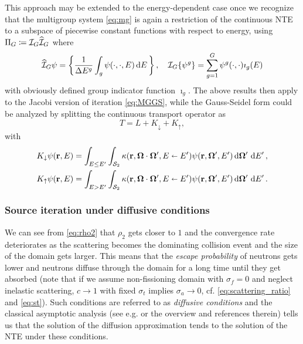 \begin{remark}\label{rem:MG}
	This approach may be extended to the energy-dependent case once we recognize that the multigroup system
	\eqref{eq:mg} is again a restriction of the continuous NTE to a subspace of piecewise constant functions with respect
	to energy, using $\Projop[G] \coloneqq \PiG\PihG$ where
	$$
		\PihG\psi = \left\{\frac{1}{\Delta E^{g}}\int_{g}\psi(\cdot,\cdot,E)\,\d{E}\right\},\quad
		\PiG\{\psi^g\} = \sum_{g=1}^G \psi^g(\cdot,\cdot)\imath_g(E)
	$$
	with obviously defined group indicator function $\imath_g$.
	The above results then apply to the Jacobi version of iteration \eqref{eq:MGGS}, while the Gauss-Seidel form
	could be analyzed by splitting the continuous transport operator as 
	$$
		T = L + K_\downarrow + K_\uparrow,
	$$
	with
	$$
	\begin{aligned}
		K_\downarrow\psi(\br,E) &= \intE[']{E \leq E'}{}{
		\intA[']{\kappa(\br,\bomega\cdot\bomega',E\sla E')\psi(\br,\bomega',E')}},\\
		K_\uparrow\psi(\br,E) &= \intE[']{E > E'}{}{
		\intA[']{\kappa(\br,\bomega\cdot\bomega',E\sla E')\psi(\br,\bomega',E')}}.
	\end{aligned}
	$$
\end{remark}

\subsubsection{Source iteration under diffusive conditions} \label{sec:diffusive} 
We can see from \eqref{eq:rho2} that $\rho_2$ gets closer
to $1$ and the convergence rate deteriorates as the scattering becomes the dominating collision event and the size of
the domain gets larger. This means that the \textit{escape probability} of neutrons gets lower and neutrons diffuse
through the domain for a long time until they get absorbed (note that if we assume non-fissioning domain with $\sigma_f
= 0$ and neglect inelastic scattering, $c \to 1$ with fixed $\sigma_t$ implies $\sigma_a \to 0$, cf.
\eqref{eq:scattering_ratio} and \eqref{eq:st}). Such conditions are referred to as \textit{diffusive conditions} and
the classical asymptotic analysis (see e.g. \cite{Larsen1} or the overview \cite{AdamsIdea} and references therein)
tells us that the solution of the diffusion approximation tends to the solution of the NTE under these conditions.

